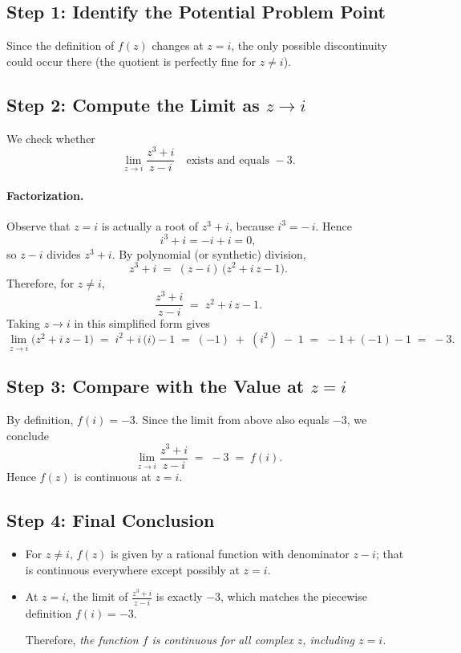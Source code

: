 \documentclass[12pt]{article}
\theoremstyle{definition} %
\theoremstyle{plain} %
\begin{document}
    \subsection*{Step 1: Identify the Potential Problem Point}
    
    Since the definition of $f(z)$ changes at $z=i$, the only possible discontinuity could occur there (the quotient is perfectly fine for $z \neq i$).  
    
    \subsection*{Step 2: Compute the Limit as \texorpdfstring{$z \to i$}{z -> i}}
    
    We check whether
    \[
    \lim_{z \to i} \dfrac{z^3 + i}{\,z - i\,}
    \quad
    \text{exists and equals } -3.
    \]
    
    \paragraph{Factorization.}
    Observe that $z=i$ is actually a root of $z^3 + i$, because $i^3 = -\,i$.  Hence
    \[
    i^3 + i = -i + i = 0,
    \]
    so $z-i$ divides $z^3 + i$.  By polynomial (or synthetic) division,
    \[
    z^3 + i \;=\; (z - i)\,\bigl(z^2 + i\,z - 1\bigr).
    \]
    Therefore, for $z \neq i$,
    \[
    \frac{z^3 + i}{z - i} 
    \;=\;
    z^2 + i\,z - 1.
    \]
    Taking $z \to i$ in this simplified form gives
    \[
    \lim_{z \to i} \bigl(z^2 + i\,z - 1\bigr)
    \;=\;
    i^2 + i\,\bigl(i\bigr) - 1
    \;=\;
    (-1) \;+\; (i^2) \;-\;1
    \;=\;
    -1 + (-1) - 1
    \;=\;
    -3.
    \]
    
    \subsection*{Step 3: Compare with the Value at \texorpdfstring{$z=i$}{z=i}}
    
    By definition, $f(i) = -3$.  Since the limit from above also equals $-3$, we conclude
    \[
    \lim_{z \to i} \dfrac{z^3 + i}{\,z - i\,} 
    \;=\;
    -3
    \;=\;
    f(i).
    \]
    Hence $f(z)$ is continuous at $z=i$.
    
    \subsection*{Step 4: Final Conclusion}
    
    \begin{itemize}
      \item For $z \neq i$, $f(z)$ is given by a rational function with denominator $z-i$; that is continuous everywhere except possibly at $z=i$.
      \item At $z=i$, the limit of $\tfrac{z^3+i}{z-i}$ is exactly $-3$, which matches the piecewise definition $f(i)=-3$.  
    
    Therefore, \emph{the function $f$ is continuous for all complex $z$, including $z=i$.}
    \end{itemize}
\end{document}
